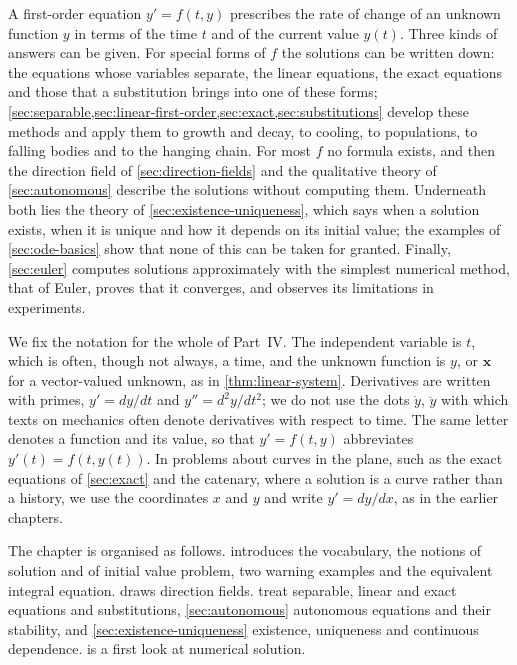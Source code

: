 A first-order equation $y'=f(t,y)$ prescribes the rate of change of an unknown function $y$ in terms of the time $t$ and of the current value $y(t)$. Three kinds of answers can be given. For special forms of $f$ the solutions can be written down: the equations whose variables separate, the linear equations, the exact equations and those that a substitution brings into one of these forms; \cref{sec:separable,sec:linear-first-order,sec:exact,sec:substitutions} develop these methods and apply them to growth and decay, to cooling, to populations, to falling bodies and to the hanging chain. For most $f$ no formula exists, and then the direction field of \cref{sec:direction-fields} and the qualitative theory of \cref{sec:autonomous} describe the solutions without computing them. Underneath both lies the theory of \cref{sec:existence-uniqueness}, which says when a solution exists, when it is unique and how it depends on its initial value; the examples of \cref{sec:ode-basics} show that none of this can be taken for granted. Finally, \cref{sec:euler} computes solutions approximately with the simplest numerical method, that of Euler, proves that it converges, and observes its limitations in experiments.

We fix the notation for the whole of Part~IV. The independent variable is $t$, which is often, though not always, a time, and the unknown function is $y$, or $\mathbf x$ for a vector-valued unknown, as in \cref{thm:linear-system}. Derivatives are written with primes, $y'=dy/dt$ and $y''=d^2y/dt^2$; we do not use the dots $\dot y$, $\ddot y$ with which texts on mechanics often denote derivatives with respect to time. The same letter denotes a function and its value, so that $y'=f(t,y)$ abbreviates $y'(t)=f(t,y(t))$. In problems about curves in the plane, such as the exact equations of \cref{sec:exact} and the catenary, where a solution is a curve rather than a history, we use the coordinates $x$ and $y$ and write $y'=dy/dx$, as in the earlier chapters.

The chapter is organised as follows.  introduces the vocabulary, the notions of solution and of initial value problem, two warning examples and the equivalent integral equation.  draws direction fields.  treat separable, linear and exact equations and substitutions, \cref{sec:autonomous} autonomous equations and their stability, and \cref{sec:existence-uniqueness} existence, uniqueness and continuous dependence.  is a first look at numerical solution.

